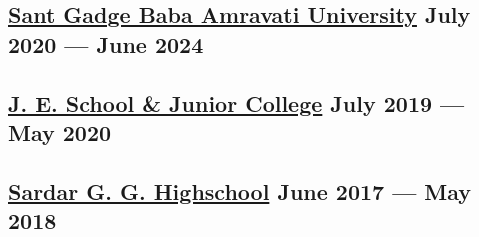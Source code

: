 





\subsection{{\href{https://www.sgbau.ac.in}{Sant Gadge Baba Amravati University} \hfill July 2020 --- June 2024}}

\vspace{0.25em}
\begin{null}

\end{null}

\subsection{{\href{https://schools.org.in/jalgaon/27031103410/j-e-sch-&-junior-college.html}{J. E. School \& 
Junior College} \hfill July 2019 --- May 2020}}
\begin{null}

\end{null}

\subsection{{\href{https://schools.org.in/jalgaon/27031408310/sardar-g-g-high-sch-raver.html}{Sardar G. G. Highschool} \hfill June 2017 --- May 2018}}
\begin{null}

\end{null}
